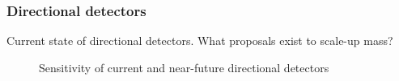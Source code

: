 \subsubsection{Directional detectors}
Current state of directional detectors. What proposals exist to scale-up mass? 
\begin{figure}
    \centering
    \caption{Sensitivity of current and near-future directional detectors}
    \label{fig:directional_sensitivity}
\end{figure}